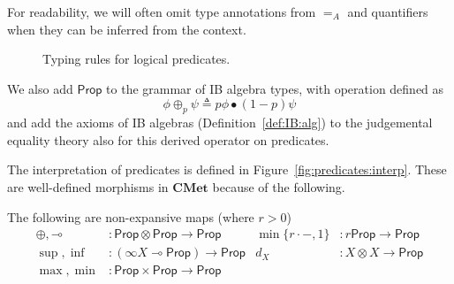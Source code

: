\documentclass[a4paper,UKenglish,cleveref, autoref, thm-restate]{lipics-v2021}
\providecommand*{\ifempty}[3]{\ifthenelse{\isempty{#1}}{#2}{#3}}
\newcommand{\lol}{\mathbin{\multimap}}
\newcommand{\cat}[1]{\mathbf{#1}}
\newcommand{\CMet}{\cat{CMet}}
\newcommand{\mprod}{\otimes}
\newcommand{\mexp}{\lol}
\newcommand{\infrule}[3][]{\infer[{\ifempty{#1}{}{(\textsc{#1})\;}}]{#3}{#2}}
\newcommand{\scaling}{}
\newcommand{\ts}{\vdash}
\newcommand{\hastype}[3]{#1\ts #2 : #3}
\newcommand{\Prop}{\mathsf{Prop}}
\newcommand{\true}{\mathsf{tt}}
\newcommand{\false}{\mathsf{ff}}
\newcommand{\ltensor}{*}
\renewcommand{\ltensor}{\bullet}
\newcommand{\lexp}{\mathbin{{-}\kern-.2em\raisebox{0ex}{$*$}}}
\renewcommand{\lexp}{\mathbin{{-}\kern-.2em\raisebox{0ex}{$\bullet$}}}
\newcommand{\peq}{=}
\newcommand{\defeq}{\triangleq}
\begin{document}
For readability, we will often omit type annotations from $\peq_A$ and quantifiers when they can be inferred from the context.

\begin{figure}[t]
\small
\centering
{}
    \caption{Typing rules for logical predicates.}
    \label{fig:predicates}
\end{figure}

We also add $\Prop$ to the grammar of IB algebra types, 
with operation defined as
\[
  \phi \oplus_p \psi \defeq p\phi \ltensor (1- p)\psi 
\]
and add the axioms of IB algebras (Definition~\ref{def:IB:alg}) to the judgemental equality theory also for this derived operator on predicates.

The interpretation of predicates is defined in Figure~\ref{fig:predicates:interp}. 
These are well-defined morphisms in $\CMet$ because of the following.
\begin{lemma} The following are non-expansive maps (where $r > 0$)
\begin{align*}
 {\oplus}, {\lol} &\colon  \Prop \mprod \Prop \to \Prop &
 \min\{r\cdot -, 1\} &\colon r \scaling \Prop \to \Prop  \\
 {\sup}, {\inf} &\colon (\infty \scaling X \mexp \Prop) \to \Prop &
 d_X &\colon X \mprod X \to \Prop \\
 \max, \min & \colon \Prop \times \Prop \to \Prop
\end{align*} 
\end{lemma}
\end{document}
